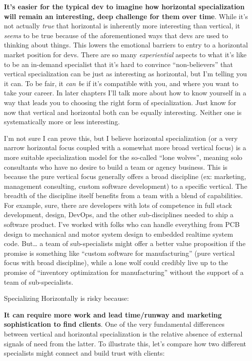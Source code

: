 \textbf{It's easier for the typical dev to imagine how horizontal specialization will remain an interesting, deep challenge for them over time}. While it's not actually \emph{true} that horizontal is inherently more interesting than vertical, it \emph{seems} to be true because of the aforementioned ways that devs are used to thinking about things. This lowers the emotional barriers to entry to a horizontal market position for devs. There are so many \emph{experiential} aspects to what it's like to be an in-demand specialist that it's hard to convince ``non-believers'' that vertical specialization can be just as interesting as horizontal, but I'm telling you it can. To be fair, it \emph{can be} if it's compatible with you, and where you want to take your career. In later chapters I'll talk more about how to know yourself in a way that leads you to choosing the right form of specialization. Just know for now that vertical and horizontal both can be equally interesting. Neither one is systematically more or less interesting.

I'm not sure I can prove this, but I believe horizontal specialization (or a very narrow horizontal focus coupled with a somewhat more broad vertical focus) is a more suitable specialization model for the so-called ``lone wolves'', meaning solo consultants who have no desire to build a team or agency business. This is because the pure vertical focus generally offers a broad discipline (ex: marketing, management consulting, custom software development) to a specific vertical. The breadth of the discipline itself benefits from a team with a blend of capabilities. For example, sure, there are developers with lots of competence in full stack development, design, DevOps, and the other sub-disciplines needed to ship a software product. I've worked with folks who can handle everything from PCB design to mechanical and motor system design to embedded realtime system code. But\ldots{} a team of sub-specialists might offer a better value proposition if the promise is something like ``custom software for manufacturing'' (pure vertical focus with broad discipline), while a lone wolf could credibly live up to the promise of ``inventory optimization for manufacturing'' without the support of a team of sub-specialists.

Specializing Horizontally is risky because:

\textbf{It can require more work and lead time/runway and marketing sophistication to find clients}. One of the very fundamental differences between vertical and horizontal specialization is the relative absence of external signals of need from the latter. To illustrate this, let's compare how two different specialists might connect and build trust with clients:

